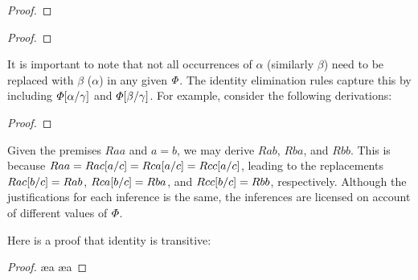 \begin{multicols}{2}
  
\begin{proof}
	 
\end{proof}

\begin{proof}
	 
\end{proof}

\end{multicols}

It is important to note that not all occurrences of $\alpha$ (similarly $\beta$) need to be replaced with $\beta$ ($\alpha$) in any given $\varPhi$.
The identity elimination rules capture this by including $\varPhi[\alpha/\gamma]$ and $\varPhi[\beta/\gamma]$.
For example, consider the following derivations:

\begin{proof}
   
    
    
\end{proof}

Given the premises $Raa$ and $a=b$, we may derive $Rab$, $Rba$, and $Rbb$.
This is because $Raa=Rac[a/c]=Rca[a/c]=Rcc[a/c]$, leading to the replacements $Rac[b/c]=Rab$, $Rca[b/c]=Rba$, and $Rcc[b/c]=Rbb$, respectively.
Although the justifications for each inference is the same, the inferences are licensed on account of different values of $\varPhi$.

Here is a proof that identity is transitive:

\begin{proof}
	\open
		\pr{}
		 \ae{a}
		 \ae{a}
	\close
	 
	 
	 
	 
\end{proof}

